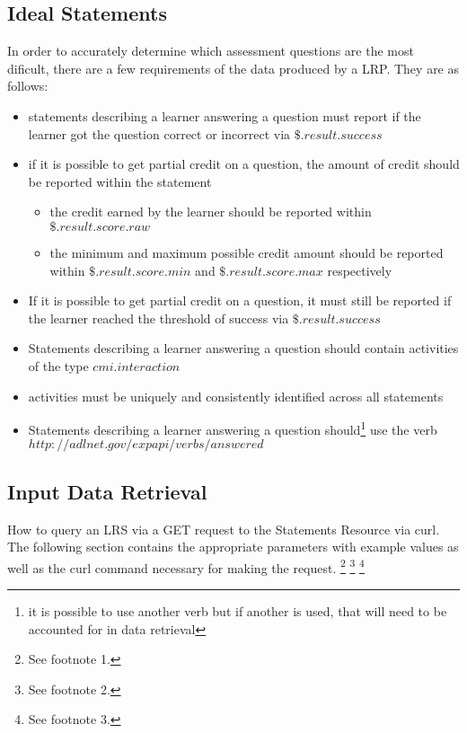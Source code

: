 \documentclass{article}
\begin{document}
\subsection{Ideal Statements}
In order to accurately determine which assessment questions are the
most dificult, there are a few requirements of the data produced by a
LRP. They are as follows:
\begin{itemize}
\item statements describing a learner answering a question must report
  if the learner got the question correct or incorrect via $\$.result.success$
\item if it is possible to get partial credit on a question, the amount
  of credit should be reported within the statement
  \begin{itemize}
  \item the credit earned by the learner should be reported within \\ $\$.result.score.raw$
  \item the minimum and maximum possible credit amount should be
    reported within $\$.result.score.min$ and $\$.result.score.max$
    respectively
  \end{itemize}
\item If it is possible to get partial credit on a question, it must
  still be reported if the learner reached the threshold of success
  via $\$.result.success$
\item Statements describing a learner answering a question should
  contain activities of the type $cmi.interaction$
\item activities must be uniquely and consistently identified across
  all statements
\item Statements describing a learner answering a question
  should\footnote{\label{verbIRI} it is possible to use another verb but if another is
      used, that will need to be accounted for in data retrieval} use
  the verb $http://adlnet.gov/expapi/verbs/answered$
\end{itemize}

\subsection{Input Data Retrieval}
How to query an LRS via a GET request to the Statements Resource via
curl. The following section contains the appropriate parameters with
example values as well as the curl command necessary for making the request.
\footnote{\label{refMoreLink} See footnote 1.}
\footnote{\label{refnoZ} See footnote 2.}
\footnote{\label{refallTime} See footnote 3.}
\end{document}
